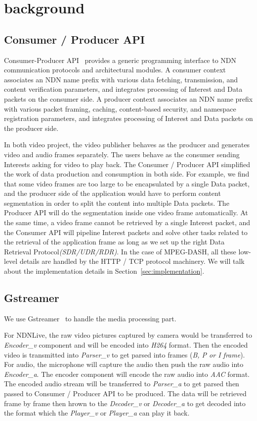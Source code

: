 \section{background} %
\label{sec:background}
\subsection{Consumer / Producer API}
Consumer-Producer API~\cite{api-tr} provides a generic programming interface to NDN communication protocols and architectural modules. A consumer context associates an NDN name prefix with various data fetching, transmission, and content verification parameters, and integrates processing of Interest and Data packets on the consumer side. A producer context associates an NDN name prefix with various packet framing, caching, content-based security, and namespace registration parameters, and integrates processing of Interest and Data packets on the producer side.

In both video project, the video publisher behaves as the producer and generates video and audio frames separately. The users behave as the consumer sending Interests asking for video to play back. The Consumer / Producer API simplified the work of data production and consumption in both side. For example, we find that some video frames are too large to be encapsulated by a single Data packet, and the producer side of the application would have to perform content segmentation in order to split the content into multiple Data packets. The Producer API will do the segmentation inside one video frame automatically. At the same time, a video frame cannot be retrieved by a single Interest packet, and the Consumer API will pipeline Interest packets and solve other tasks related to the retrieval of the application frame as long as we set up the right Data Retrieval Protocol\textit{(SDR/UDR/RDR)}. In the case of MPEG-DASH, all these low-level details are handled by the HTTP / TCP protocol machinery. We will talk about the implementation details in Section~\ref{sec:implementation}.
\subsection{Gstreamer}

We use Gstreamer~\cite{gstreamer} to handle the media processing part. 

For NDNLive, the raw video pictures captured by camera would be transferred to \textit{Encoder\_v} component and will be encoded into \textit{H264} format. Then the encoded video is transmitted into \textit{Parser\_v} to get parsed into frames (\textit{B, P or I frame}). For audio, the microphone will capture the audio then push the raw audio into \textit{Encoder\_a}. The encoder component will encode the raw audio into \textit{AAC} format. The encoded audio stream will be transferred to \textit{Parser\_a} to get parsed then passed to Consumer / Producer API to be produced. The data will be retrieved frame by frame then hrown to the \textit{Decoder\_v} or \textit{Decoder\_a} to get decoded into the format which the \textit{Player\_v} or \textit{Player\_a} can play it back.

